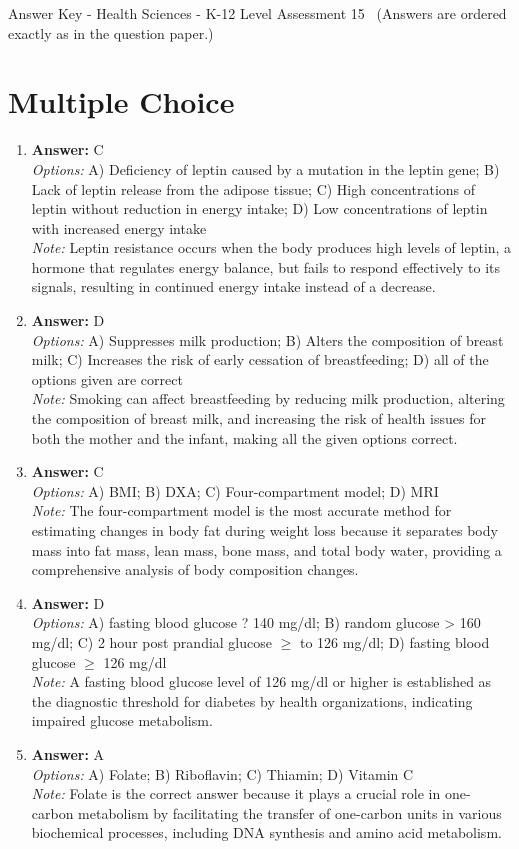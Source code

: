 \documentclass[12pt]{article}
\begin{document}
\begin{center}
Answer Key - Health Sciences - K-12 Level Assessment 15 \
\small (Answers are ordered exactly as in the question paper.)
\end{center}

\section*{Multiple Choice}
\begin{enumerate}[label=\arabic*.]
\item \textbf{Answer:} C
\\ \textit{Options:} A) Deficiency of leptin caused by a mutation in the leptin gene; B) Lack of leptin release from the adipose tissue; C) High concentrations of leptin without reduction in energy intake; D) Low concentrations of leptin with increased energy intake
\\ \textit{Note:} Leptin resistance occurs when the body produces high levels of leptin, a hormone that regulates energy balance, but fails to respond effectively to its signals, resulting in continued energy intake instead of a decrease.
\item \textbf{Answer:} D
\\ \textit{Options:} A) Suppresses milk production; B) Alters the composition of breast milk; C) Increases the risk of early cessation of breastfeeding; D) all of the options given are correct
\\ \textit{Note:} Smoking can affect breastfeeding by reducing milk production, altering the composition of breast milk, and increasing the risk of health issues for both the mother and the infant, making all the given options correct.
\item \textbf{Answer:} C
\\ \textit{Options:} A) BMI; B) DXA; C) Four-compartment model; D) MRI
\\ \textit{Note:} The four-compartment model is the most accurate method for estimating changes in body fat during weight loss because it separates body mass into fat mass, lean mass, bone mass, and total body water, providing a comprehensive analysis of body composition changes.
\item \textbf{Answer:} D
\\ \textit{Options:} A) fasting blood glucose ? 140 mg/dl; B) random glucose \textgreater{} 160 mg/dl; C) 2 hour post prandial glucose \ensuremath{\geq} to 126 mg/dl; D) fasting blood glucose \ensuremath{\geq} 126 mg/dl
\\ \textit{Note:} A fasting blood glucose level of 126 mg/dl or higher is established as the diagnostic threshold for diabetes by health organizations, indicating impaired glucose metabolism.
\item \textbf{Answer:} A
\\ \textit{Options:} A) Folate; B) Riboflavin; C) Thiamin; D) Vitamin C
\\ \textit{Note:} Folate is the correct answer because it plays a crucial role in one-carbon metabolism by facilitating the transfer of one-carbon units in various biochemical processes, including DNA synthesis and amino acid metabolism.
\end{enumerate}
\end{document}
